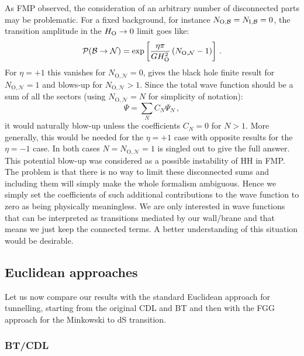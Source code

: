 \documentclass[11pt,a4paper]{article}
\newcommand{\be}{\begin{equation}}
\newcommand{\ee}{\end{equation}}
\begin{document}
As FMP observed, the consideration of an arbitrary number of disconnected parts may be problematic. For a fixed background, for instance $N_{\rm O, \mathcal{B}}=N_{\rm I, \mathcal{B}}=0$, the transition amplitude in the $H_{\rm O} \rightarrow 0$ limit goes like:
\be
\mathcal{P}(\mathcal{B} \rightarrow \mathcal{N}) = \exp\left[\frac{\eta\pi}{G H_{\rm O}^2}\left(N_{\rm O, \mathcal{N}}-1\right)\right] \,.
\ee
For $\eta=+1$ this vanishes for $N_{\text{O}, \mathcal{N}}=0$, gives the black hole finite result for $N_{\text{O},\mathcal{N}} = 1$ and blows-up for $N_{\text{O}, \mathcal{N}} > 1$. Since the total wave function should be a sum of all the sectors (using $N_{\text{O}, \mathcal{N}} = N$ for simplicity of notation):
\be
\Psi=\sum_{N} C_N \Psi_N \,,
\ee
it would naturally blow-up unless the coefficients $C_N = 0$ for $N > 1$. More generally, this would be needed for the $\eta = + 1$ case with opposite results for the $\eta = -1$ case. In both cases $N = N_{\text{O}, \mathcal{N}} = 1$ is singled out to give the full answer.
This potential blow-up was considered as a possible instability of HH in FMP. The problem is that there is no way to limit these disconnected sums and including them will simply make the whole formalism ambiguous. Hence we simply set the coefficients of such additional contributions to the wave function to zero as being physically meaningless. We are only interested in wave functions that can be interpreted as transitions mediated by our wall/brane and that means we just keep the connected terms. A better understanding of this situation would be desirable.

\subsection{Euclidean approaches}
Let us now compare our results with the standard Euclidean approach for tunnelling, starting from the original CDL and BT and then with the FGG approach for the Minkowski to dS transition.

\subsubsection*{BT/CDL}
\end{document}
